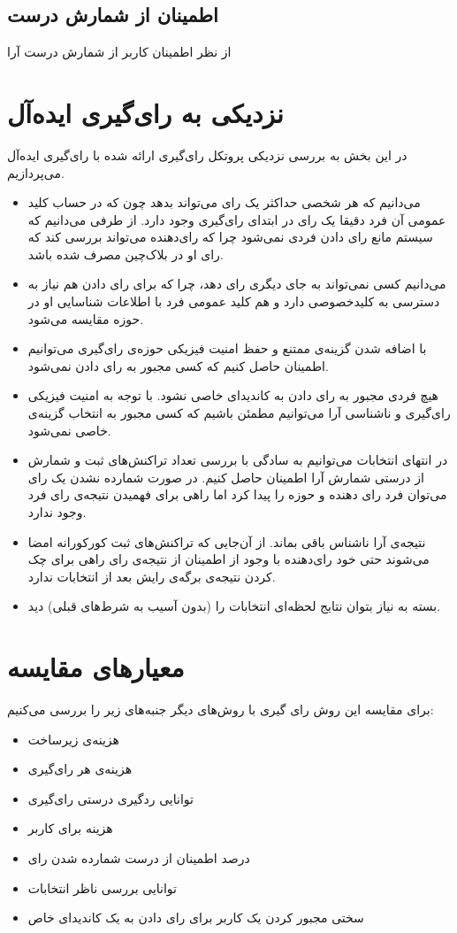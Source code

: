 \subsection{اطمینان از شمارش درست}
از نظر اطمینان کاربر از شمارش درست آرا
 	 
 	 
 	 

\section{نزدیکی به رای‌گیری ایده‌آل}
در این بخش به بررسی نزدیکی پروتکل رای‌گیری ارائه شده با رای‌گیری ایده‌آل می‌پردازیم. 

\begin{itemize}
	\item 
	می‌دانیم که هر شخصی حداکثر یک رای‌ می‌تواند بدهد چون که در حساب کلید عمومی آن فرد دقیقا یک رای در ابتدای رای‌گیری وجود دارد. از طرفی می‌دانیم که سیستم مانع رای دادن فردی نمی‌شود چرا که رای‌دهنده می‌تواند بررسی کند که رای‌ او در بلاک‌چین مصرف شده باشد.
	\item 
	می‌دانیم کسی نمی‌تواند به جای دیگری رای دهد، چرا که برای رای دادن هم نیاز به دسترسی به کلیدخصوصی دارد و هم کلید عمومی فرد با اطلاعات شناسایی او در حوزه مقایسه می‌شود.
	\item 
	با اضافه شدن گزینه‌ی ممتنع و حفظ امنیت فیزیکی حوزه‌ی رای‌گیری می‌توانیم اطمینان حاصل کنیم که کسی مجبور به رای‌ دادن نمی‌شود.
	\item 
	هیچ فردی مجبور به رای دادن به کاندیدای خاصی نشود. با توجه به امنیت فیزیکی رای‌گیری و ناشناسی آرا می‌توانیم مطمئن باشیم که کسی مجبور به انتخاب گزینه‌ی خاصی نمی‌شود.
	\item 
	در انتهای انتخابات می‌توانیم به سادگی با بررسی تعداد تراکنش‌های ثبت و شمارش از درستی شمارش آرا اطمینان حاصل کنیم. در صورت شمارده نشدن یک رای می‌توان فرد رای‌ دهنده و حوزه را پیدا کرد اما راهی برای فهمیدن نتیجه‌ی رای فرد وجود ندارد.
	\item 
	نتیجه‌ی آرا ناشناس  باقی بماند. از آن‌جایی که تراکنش‌های ثبت کورکورانه امضا می‌شوند حتی خود رای‌دهنده با وجود از اطمینان از نتیجه‌ی رای راهی برای چک کردن نتیجه‌ی برگه‌ی رایش بعد از انتخابات ندارد.
	\item 
	بسته به نیاز بتوان نتایج لحظه‌ای انتخابات را (بدون آسیب به شرط‌های قبلی) دید.
\end{itemize}


\section{معیار‌های مقایسه}
برای مقایسه این روش رای گیری با روش‌های دیگر جنبه‌های زیر را بررسی می‌کنیم:
\begin{itemize}
	\item
	هزینه‌ی زیرساخت
	\item
	هزینه‌ی هر رای‌گیری
	\item 
	توانایی ردگیری درستی رای‌گیری
	\item
	هزینه برای کاربر
	\item
	درصد اطمینان از درست شمارده شدن رای 
	\item 
	توانایی بررسی ناظر انتخابات
	\item 
	سختی مجبور کردن یک کاربر برای رای دادن به یک کاندیدای خاص
\end{itemize}

